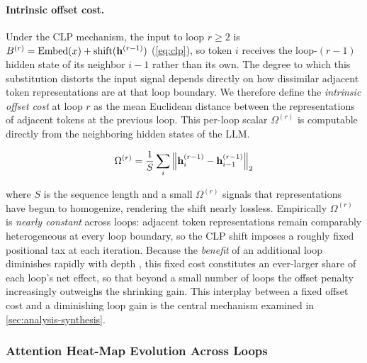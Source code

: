 \paragraph{Intrinsic offset cost.}
Under the CLP mechanism, the input to loop $r \geq 2$ is
$B^{(r)} = \mathrm{Embed}(x) + \mathrm{shift}(\mathbf{h}^{(r-1)})$
(\autoref{eq:clp}), so token $i$ receives the loop-$(r{-}1)$ hidden state
of its neighbor $i{-}1$ rather than its own.
The degree to which this substitution distorts the input signal depends
directly on how dissimilar adjacent token representations are at that
loop boundary.
We therefore define the \emph{intrinsic offset cost} at loop $r$ as the mean
Euclidean distance between the representations of adjacent tokens at the
previous loop. This per-loop scalar $\Omega^{(r)}$ is computable directly from the neighboring hidden states of the LLM.
\begin{MiddleEquation}
\begin{equation}
  \Omega^{(r)} =
  \frac{1}{S}\sum_{i} \left\|\mathbf{h}^{(r-1)}_i - \mathbf{h}^{(r-1)}_{i-1}\right\|_2
  \label{eq:offset-cost}
\end{equation}
\end{MiddleEquation}where $S$ is the sequence length and a small $\Omega^{(r)}$
signals that representations have begun to homogenize, rendering the
shift nearly lossless.
Empirically $\Omega^{(r)}$ is \emph{nearly constant} across loops: adjacent
token representations remain comparably heterogeneous at every loop boundary,
so the CLP shift imposes a roughly fixed positional tax at each iteration.
Because the \emph{benefit} of an additional loop diminishes rapidly with depth
, this fixed cost
constitutes an ever-larger share of each loop's net effect, so that beyond a
small number of loops the offset penalty increasingly outweighs the shrinking
gain.
This interplay between a fixed offset cost and a diminishing loop gain is the
central mechanism examined in \autoref{sec:analysis-synthesis}.

\subsubsection{Attention Heat-Map Evolution Across Loops}
\label{sec:analysis-attn}

